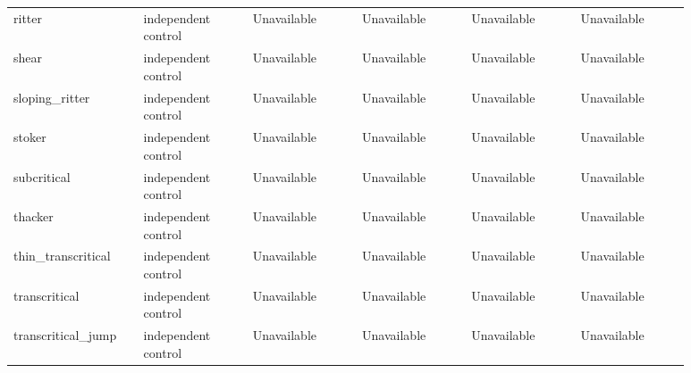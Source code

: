 \begin{longtable}{p{0.1467\linewidth}p{0.1467\linewidth}p{0.1467\linewidth}p{0.1467\linewidth}p{0.1467\linewidth}p{0.1467\linewidth}}
ritter & independent control & Unavailable & Unavailable & Unavailable & Unavailable \\
shear & independent control & Unavailable & Unavailable & Unavailable & Unavailable \\
sloping\_ritter & independent control & Unavailable & Unavailable & Unavailable & Unavailable \\
stoker & independent control & Unavailable & Unavailable & Unavailable & Unavailable \\
subcritical & independent control & Unavailable & Unavailable & Unavailable & Unavailable \\
thacker & independent control & Unavailable & Unavailable & Unavailable & Unavailable \\
thin\_transcritical & independent control & Unavailable & Unavailable & Unavailable & Unavailable \\
transcritical & independent control & Unavailable & Unavailable & Unavailable & Unavailable \\
transcritical\_jump & independent control & Unavailable & Unavailable & Unavailable & Unavailable \\
\end{longtable}
\endgroup
